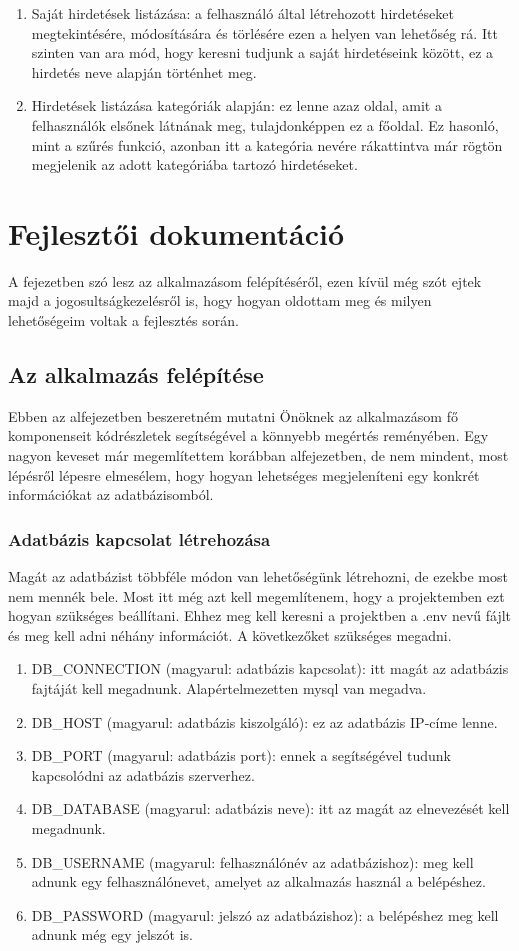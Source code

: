 \documentclass[]{thesis-ekf}
\theoremstyle{definition}
\theoremstyle{remark}
\begin{document}
\begin{enumerate}
			\item Saját hirdetések listázása: a felhasználó által létrehozott hirdetéseket megtekintésére, módosítására és törlésére ezen a helyen van lehetőség rá. Itt szinten van ara mód, hogy keresni tudjunk a saját hirdetéseink között, ez a hirdetés neve alapján történhet meg.
			\item Hirdetések listázása kategóriák alapján: ez lenne azaz oldal, amit a felhasználók elsőnek látnának meg, tulajdonképpen ez a főoldal. Ez hasonló, mint a szűrés funkció, azonban itt a kategória nevére rákattintva már rögtön megjelenik az adott kategóriába tartozó hirdetéseket.
		\end{enumerate}
	
	\chapter{Fejlesztői dokumentáció}
		A fejezetben szó lesz az alkalmazásom felépítéséről, ezen kívül még szót ejtek majd a jogosultságkezelésről is, hogy hogyan oldottam meg és milyen lehetőségeim voltak a fejlesztés során.
	\section{Az alkalmazás felépítése}
		Ebben az alfejezetben beszeretném mutatni Önöknek az alkalmazásom fő komponenseit kódrészletek segítségével a könnyebb megértés reményében. Egy nagyon keveset már megemlítettem korábban  alfejezetben, de nem mindent, most lépésről lépesre elmesélem, hogy hogyan lehetséges megjeleníteni egy konkrét információkat az adatbázisomból.
	\subsection{Adatbázis kapcsolat létrehozása}
		Magát az adatbázist többféle módon van lehetőségünk létrehozni, de ezekbe most nem mennék bele. Most itt még azt kell megemlítenem, hogy a projektemben ezt hogyan szükséges beállítani. Ehhez meg kell keresni a projektben a .env nevű fájlt és meg kell adni néhány információt. A következőket szükséges megadni.
		\begin{enumerate}
			\item DB\_CONNECTION (magyarul: adatbázis kapcsolat): itt magát az adatbázis fajtáját kell megadnunk. Alapértelmezetten mysql van megadva. 
			\item DB\_HOST (magyarul: adatbázis kiszolgáló): ez az adatbázis IP-címe lenne.
			\item DB\_PORT (magyarul: adatbázis port): ennek a segítségével tudunk kapcsolódni az adatbázis szerverhez. 
			\item DB\_DATABASE (magyarul: adatbázis neve): itt az magát az elnevezését kell megadnunk.
			\item DB\_USERNAME (magyarul: felhasználónév az adatbázishoz): meg kell adnunk egy felhasználónevet, amelyet az alkalmazás használ a belépéshez.
			\item DB\_PASSWORD (magyarul: jelszó az adatbázishoz): a belépéshez meg kell adnunk még egy jelszót is.
			
		\end{enumerate}
\end{document}
